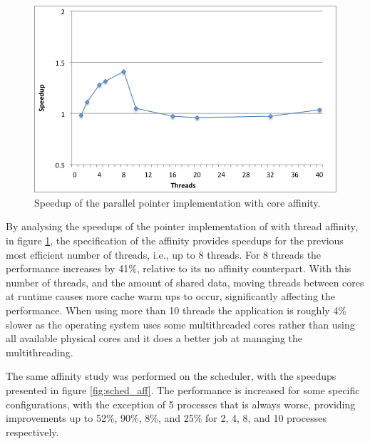 \begin{figure}[!htp]
	\begin{center}
		\includegraphics[scale=0.55]{charts/speedup_pointer_aff.png}
		\caption{Speedup of the \tth parallel pointer implementation with core affinity.}
		\label{fig:pointer_aff}
	\end{center}
\end{figure}

By analysing the speedups of the pointer implementation of \tth with thread affinity, in figure \ref{fig:pointer_aff}, the specification of the affinity provides speedups for the previous most efficient number of threads, i.e., up to 8 threads. For 8 threads the performance increases by 41\%, relative to its no affinity counterpart. With this number of threads, and the amount of shared data, moving threads between cores at runtime causes more cache warm ups to occur, significantly affecting the performance. When using more than 10 threads the application is roughly 4\% slower as the operating system uses some multithreaded cores rather than using all available physical cores and it does a better job at managing the multithreading.

The same affinity study was performed on the scheduler, with the speedups presented in figure \ref{fig:sched_aff}. The performance is increased for some specific configurations, with the exception of 5 processes that is always worse, providing improvements up to 52\%, 90\%, 8\%, and 25\% for 2, 4, 8, and 10 processes respectively.

